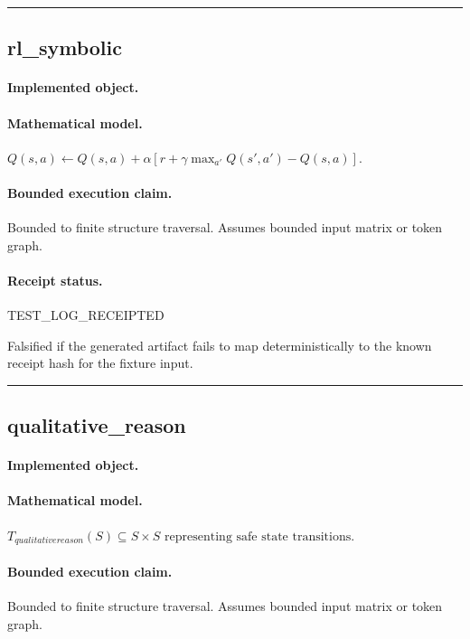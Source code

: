 \vspace{1em}\hrule\vspace{1em}
\subsection{rl\_symbolic}
\paragraph{Implemented object.} 
\paragraph{Mathematical model.} $Q(s,a) \leftarrow Q(s,a) + \alpha\left[r+\gamma\max_{a'}Q(s',a')-Q(s,a)\right].$
\paragraph{Bounded execution claim.} Bounded to finite structure traversal. Assumes bounded input matrix or token graph.
\paragraph{Receipt status.} TEST\_LOG\_RECEIPTED
\begin{falsifier}
Falsified if the generated artifact fails to map deterministically to the known receipt hash for the fixture input.
\end{falsifier}

\vspace{1em}\hrule\vspace{1em}
\subsection{qualitative\_reason}
\paragraph{Implemented object.} 
\paragraph{Mathematical model.} $T_{qualitativereason}(S) \subseteq S \times S \text{ representing safe state transitions}.$
\paragraph{Bounded execution claim.} Bounded to finite structure traversal. Assumes bounded input matrix or token graph.
